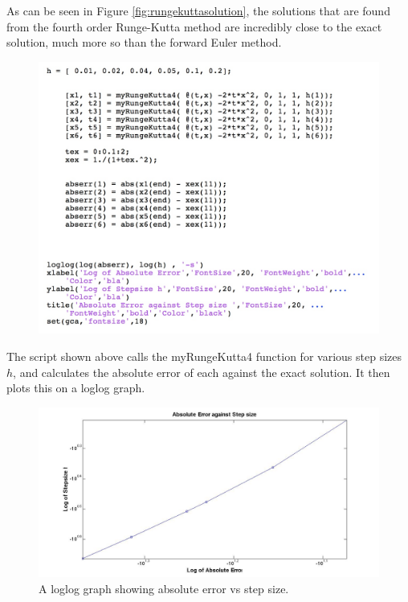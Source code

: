 \documentclass[a4paper]{article}
\begin{document}

As can be seen in Figure \ref{fig:rungekuttasolution}, the solutions that are found from the fourth order Runge-Kutta method are incredibly close to the exact solution, much more so than the forward Euler method.  


\begin{figure}[H]
\includegraphics[width=1\textwidth]{rungekuttacodeerrors.jpg}
\end{figure}

The script shown above calls the myRungeKutta4 function for various step sizes $h$, and calculates the absolute error of each against the exact solution. It then plots this on a loglog graph.


\begin{figure}[H]
\centering
\includegraphics[width=1\textwidth]{rungekuttaerror.jpg}
\caption{\label{fig:rungekuttaerror}A loglog graph showing absolute error vs step size. }
\end{figure}
\end{document}
